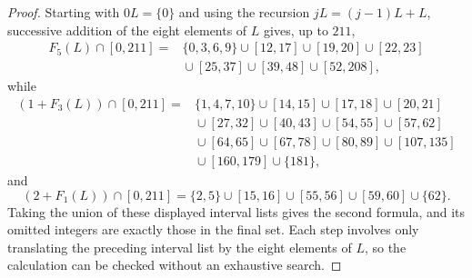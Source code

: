 \documentclass[12pt]{article}
\theoremstyle{plain}
\theoremstyle{definition}
\theoremstyle{plain}
\begin{document}
\begin{proof}
Starting with $0L=\{0\}$ and using the recursion
$jL=(j-1)L+L$, successive addition of the eight elements of $L$ gives,
up to $211$,
\[
\begin{aligned}
F_5(L)\cap[0,211]={}&\{0,3,6,9\}\cup[12,17]\cup[19,20]\cup[22,23]\\
 &{}\cup[25,37]\cup[39,48]\cup[52,208],
\end{aligned}
\]
while
\[
\begin{aligned}
(1+F_3(L))\cap[0,211]
={}&\{1,4,7,10\}\cup[14,15]\cup[17,18]\cup[20,21]\\
 &{}\cup[27,32]\cup[40,43]\cup[54,55]\cup[57,62]\\
 &{}\cup[64,65]\cup[67,78]\cup[80,89]\cup[107,135]\\
 &{}\cup[160,179]\cup\{181\},
\end{aligned}
\]
and
\[
 (2+F_1(L))\cap[0,211]
 =\{2,5\}\cup[15,16]\cup[55,56]\cup[59,60]\cup\{62\}.
\]
Taking the union of these displayed interval lists gives the second
formula, and its omitted integers are exactly those in the final set.
Each step involves only translating the preceding interval list by the
eight elements of $L$, so the calculation can be checked without an
exhaustive search.
\end{proof}
\end{document}
